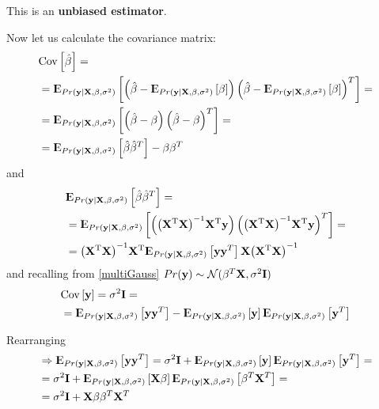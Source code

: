 \documentclass[12pt, letterpaper]{article}
\theoremstyle{definition}
\newcommand{\E}{{\rm I\kern-.3em E}}
\newcommand{\Cov}{\mathrm{Cov}}
\newcommand{\X}{\mathrm{\mathbf{X}}}
\newcommand{\y}{\mathbf{y}}
\newcommand{\inv}{\mathrm{\left( \X^T\X\right)^{-1}}}
\newcommand{\HM}{\mathrm{\inv\X^T}}
\newcommand{\hb}{\mathrm{\hat{\mathbf{\beta}}}}
\begin{document}
This is an \textbf{unbiased estimator}.

Now let us calculate the covariance matrix:
\begin{equation}
\begin{aligned}
&\Cov \left[\hb \right] = \\
&=\E_{Pr(\y|\X,\beta, \sigma^2)}\left[ \left( \hb -\E_{Pr(\y|\X,\beta, \sigma^2)}\left[ \beta\right] \right) \left( \hb -\E_{Pr(\y|\X,\beta, \sigma^2)}\left[ \beta\right] \right)^T\right] = \\
&=\E_{Pr(\y|\X,\beta, \sigma^2)}\left[ \left( \hb - \beta \right) \left( \hb - \beta \right)^T\right] =\\
&=\E_{Pr(\y|\X,\beta, \sigma^2)}\left[ \hb\hb^T\right] -\beta\beta^T\end{aligned}
\end{equation}
and
\begin{equation}
\begin{aligned}
&\E_{Pr(\y|\X,\beta, \sigma^2)}\left[ \hb\hb^T\right] = \\
&=\E_{Pr(\y|\X,\beta, \sigma^2)} \left[ \left( \HM \y\right)\left( \HM \y\right)^T\right] = \\
& = \HM\E_{Pr(\y|\X,\beta, \sigma^2)} \left[   \y  \y^T\right] \X \inv
\end{aligned}
\end{equation}
and recalling from \autoref{multiGauss} $Pr(\y) \sim \CMcal{N}(\beta^T \X ,\sigma^2 \mathbf{I})$
\begin{equation}
\begin{aligned}
&\Cov\left[ \y\right]=\sigma^2 \mathbf{I} =\\
&=\E_{Pr(\y|\X,\beta, \sigma^2)}\left[ \y\y^T\right]  - \E_{Pr(\y|\X,\beta, \sigma^2)}\left[ \y\right]\E_{Pr(\y|\X,\beta, \sigma^2)}\left[ \y^T\right]\\
\end{aligned}
\end{equation}

Rearranging
\begin{equation}
\begin{aligned}
&\Rightarrow \E_{Pr(\y|\X,\beta, \sigma^2)}\left[ \y\y^T\right] = \sigma^2 \mathbf{I} +\E_{Pr(\y|\X,\beta, \sigma^2)}\left[ \y\right]\E_{Pr(\y|\X,\beta, \sigma^2)}\left[ \y^T\right] =\\
&=\sigma^2 \mathbf{I} +\E_{Pr(\y|\X,\beta, \sigma^2)}\left[ \X\beta\right]\E_{Pr(\y|\X,\beta, \sigma^2)}\left[ \beta^T\X^T\right] =\\
&= \sigma^2 \mathbf{I} +\X\beta \beta^T\X^T
\end{aligned}
\end{equation}
\end{document}
